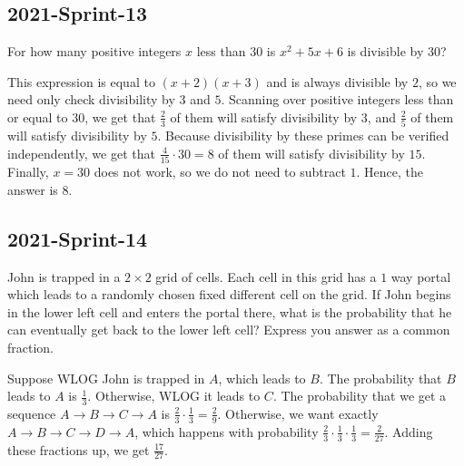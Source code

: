 \documentclass[12pt]{article}
\begin{document}
\subsection*{2021-Sprint-13}
For how many positive integers $x$ less than $30$ is $x^2+5x+6$ is divisible by $30$?
\begin{answer}
This expression is equal to $(x+2)(x+3)$ and is always divisible by $2$, so we need only check divisibility by $3$ and $5$. Scanning over positive integers less than or equal to $30$, we get that $\frac{2}{3}$ of them will satisfy divisibility by $3$, and $\frac{2}{5}$ of them will satisfy divisibility by $5$. Because divisibility by these primes can be verified independently, we get that $\frac{4}{15}\cdot 30 = 8$ of them will satisfy divisibility by $15$. Finally, $x = 30$ does not work, so we do not need to subtract $1$. Hence, the answer is $\boxed{8}$.
\end{answer}

\subsection*{2021-Sprint-14}
John is trapped in a $2\times 2$ grid of cells. Each cell in this grid has a $1$ way portal which leads to a randomly chosen fixed different cell on the grid. If John begins in the lower left cell and enters the portal there, what is the probability that he can eventually get back to the lower left cell? Express you answer as a common fraction.
\begin{answer}
Suppose WLOG John is trapped in $A$, which leads to $B$. The probability that $B$ leads to $A$ is $\frac{1}{3}$. Otherwise, WLOG it leads to $C$. The probability that we get a sequence $A \to B \to C \to A$ is $\frac{2}{3}\cdot \frac{1}{3} = \frac{2}{9}$. Otherwise, we want exactly $A \to B \to C \to D \to A$, which happens with probability $\frac{2}{3}\cdot \frac{1}{3}\cdot \frac{1}{3} = \frac{2}{27}$. Adding these fractions up, we get $\boxed{\frac{17}{27}}$.
\end{answer}

\end{document}
